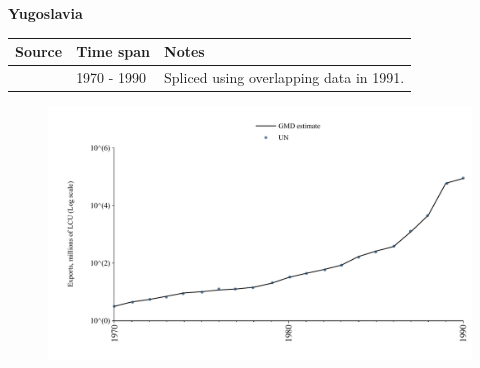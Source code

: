 \documentclass[12pt,a4paper,landscape]{article}
\begin{document}
\begin{adjustbox}{max totalsize={\paperwidth}{\paperheight},center}
\begin{minipage}[t][\textheight][t]{\textwidth}
\vspace*{0.5cm}
{}
\begin{center}
{\Large\bfseries Yugoslavia}
\end{center}
\vspace{0.5cm}
\begin{table}[H]
\centering
\small
\begin{tabular}{|l|l|l|}
\hline
\textbf{Source} & \textbf{Time span} & \textbf{Notes} \\
\hline
\rowcolor{white}\cite{UN}& 1970 - 1990 &Spliced using overlapping data in 1991.\\
\hline
\end{tabular}
\end{table}
\begin{figure}[H]
\centering
\includegraphics[width=\textwidth,height=0.6\textheight,keepaspectratio]{graphs/YUG_exports.pdf}
\end{figure}
\end{minipage}
\end{adjustbox}
\end{document}
